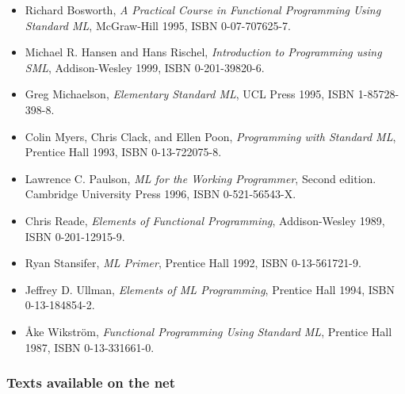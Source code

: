 \documentclass[fleqn,a4paper]{article}
\begin{document}
\begin{itemize}
\item Richard Bosworth, {\em A Practical Course in Functional
    Programming Using Standard ML}, McGraw-Hill 1995, ISBN
  0-07-707625-7.
\item Michael R. Hansen and Hans Rischel, \emph{Introduction to
    Programming using SML}, Addison-Wesley 1999, ISBN 0-201-39820-6.
\item Greg Michaelson, {\em Elementary Standard ML\/}, UCL Press 1995,
  ISBN 1-85728-398-8.
\item Colin Myers, Chris Clack, and Ellen Poon, {\em Programming with
    Standard ML\/}, Prentice Hall 1993, ISBN 0-13-722075-8.
\item Lawrence C. Paulson, {\em ML for the Working Programmer\/},
  Second edition.  Cambridge University Press 1996, ISBN
  0-521-56543-X.  
\item Chris Reade, {\em Elements of Functional Programming\/},
  Addison-Wesley 1989, ISBN 0-201-12915-9.
\item Ryan Stansifer, {\em ML Primer\/}, Prentice Hall 1992, ISBN
  0-13-561721-9.
\item Jeffrey D. Ullman, {\em Elements of ML Programming\/}, Prentice
  Hall 1994, ISBN 0-13-184854-2.
\item {\AA}ke Wikstr{\"o}m, {\em Functional Programming Using Standard
    ML\/}, Prentice Hall 1987, ISBN 0-13-331661-0.
\end{itemize}

\subsubsection*{Texts available on the net}
\end{document}
